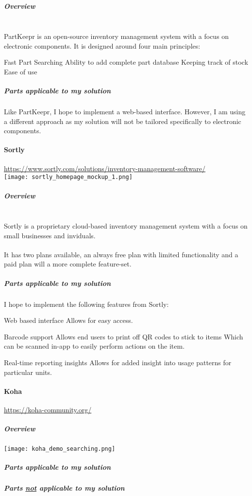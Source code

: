 \documentclass[../../../main.tex]{subfiles}
\begin{document}
\subparagraph[indent=false]{Overview}

\noindent \\PartKeepr is an open-source inventory management system with a focus on electronic components.
It is designed around four main principles:

\begin{outline}
    \1 Fast Part Searching
    \1 Ability to add complete part database
    \1 Keeping track of stock
    \1 Ease of use
\end{outline}

\subparagraph{Parts applicable to my solution\\}

\noindent Like PartKeepr, I hope to implement a web-based interface.
However, I am using a different approach as my solution will not be tailored specifically to electronic components.

\pagebreak

\paragraph{Sortly}
\url{https://www.sortly.com/solutions/inventory-management-software/}\\

\texttt{[image: sortly\_homepage\_mockup\_1.png]}

\subparagraph{Overview}

\noindent \\Sortly is a proprietary cloud-based inventory management system with a focus on small businesses and inviduals.\\\\
It has two plans available, an always free plan with limited functionality and a paid plan will a more complete feature-set.

\subparagraph{Parts applicable to my solution\\}

I hope to implement the following features from Sortly:

\begin{outline}
    \1 Web based interface
    \2 Allows for easy access.

    \1 Barcode support
    \2 Allows end users to print off QR codes to stick to items
    \2 Which can be scanned in-app to easily perform actions on the item.

    \1 Real-time reporting insights
    \2 Allows for added insight into usage patterns for particular units.
\end{outline}

\pagebreak

\paragraph{Koha}
\url{https://koha-community.org/}

\subparagraph{Overview}

\texttt{[image: koha\_demo\_searching.png]}

\subparagraph{Parts applicable to my solution\\}
\subparagraph{Parts \underline{not} applicable to my solution\\}
\end{document}
